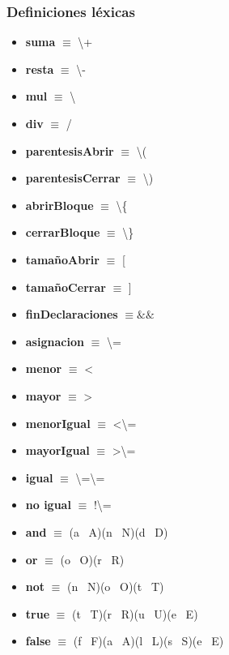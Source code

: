 \documentclass[11pt]{article}
\begin{document}
        \subsubsection*{Definiciones léxicas}
        \begin{itemize}
            \item \textbf{suma }$\equiv$ \textbackslash+
            \item \textbf{resta }$\equiv$ \textbackslash-
            \item \textbf{mul }$\equiv$ \textbackslash*
            \item \textbf{div }$\equiv$ /
            \item \textbf{parentesisAbrir }$\equiv$ \textbackslash(
            \item \textbf{parentesisCerrar }$\equiv$ \textbackslash)
            \item \textbf{abrirBloque }$\equiv$ \textbackslash\{
            \item \textbf{cerrarBloque }$\equiv$ \textbackslash\}
            \item \textbf{tamañoAbrir  }$\equiv$ [
            \item \textbf{tamañoCerrar }$\equiv$ ]
            \item \textbf{finDeclaraciones }$\equiv \&\& $
            \item \textbf{asignacion }$\equiv$ \textbackslash=
            \item \textbf{menor }$\equiv$ \textless
            \item \textbf{mayor }$\equiv$ \textgreater
            \item \textbf{menorIgual }$\equiv$ \textless\textbackslash=
            \item \textbf{mayorIgual }$\equiv$ \textgreater\textbackslash=
            \item \textbf{igual }$\equiv$ \textbackslash=\textbackslash=
            \item \textbf{no igual }$\equiv$ !\textbackslash=
            \item \textbf{and }$\equiv$ (a \textbar\ A)(n \textbar\ N)(d \textbar\ D)
            \item \textbf{or }$\equiv$ (o \textbar\ O)(r \textbar\ R)
            \item \textbf{not }$\equiv$ (n \textbar\ N)(o \textbar\ O)(t \textbar\ T)
            \item \textbf{true }$\equiv$ (t \textbar\ T)(r \textbar\ R)(u \textbar\ U)(e \textbar\ E)
            \item \textbf{false }$\equiv$ (f \textbar\ F)(a \textbar\ A)(l \textbar\ L)(s \textbar\ S)(e \textbar\ E)

\end{itemize}
\end{document}
